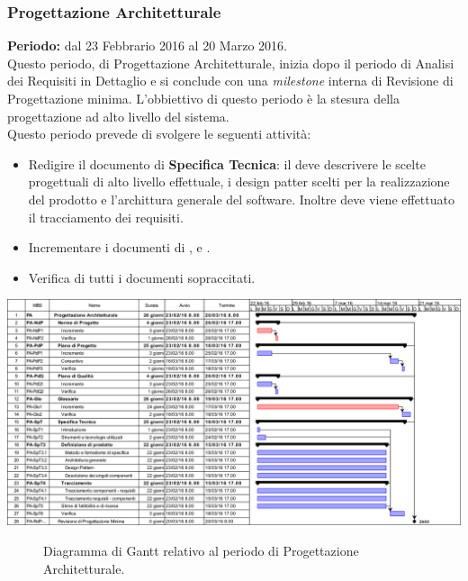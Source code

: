 \subsubsection{Progettazione Architetturale}
\textbf{Periodo:} dal 23 Febbrario 2016 al 20 Marzo 2016. \\
Questo periodo, di Progettazione Architetturale, inizia dopo il periodo di Analisi dei Requisiti in Dettaglio e si conclude con una \textit{milestone} interna di Revisione di Progettazione minima. L'obbiettivo di questo periodo è la stesura della progettazione ad alto livello del sistema. \\
Questo periodo prevede di svolgere le seguenti attività:
\begin{itemize}
	\item Redigire il documento di \textbf{Specifica Tecnica}: il \Prog deve descrivere le scelte progettuali di alto livello effettuale, i design patter scelti per la realizzazione del prodotto e l'archittura generale del software. Inoltre deve viene effettuato il tracciamento dei requisiti.  
	\item Incrementare i documenti di \textbf{\NdP},\textbf{\PdP} e \textbf{\PdQ}.
	\item Verifica di tutti i documenti sopraccitati.
\end{itemize}
\begin{center}
	\includegraphics[keepaspectratio = true, width=15cm]{immagini/PdP_ProgettazioneArchitetturaleGantt.png}
\end{center}
\begin{figure}[h]
	\caption{Diagramma di Gantt relativo al periodo di Progettazione Architetturale.}\label{etichetta}
\end{figure}

